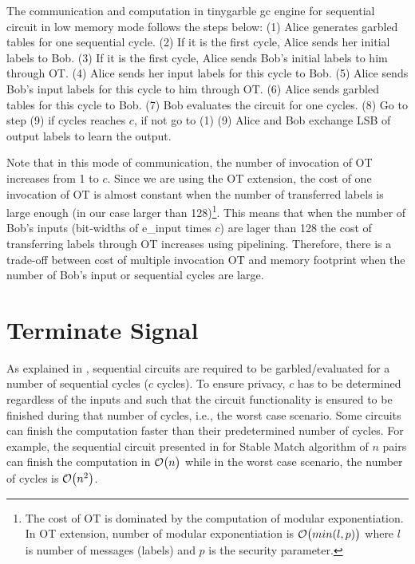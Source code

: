 The communication and computation in \gls{tinygarble} \acrshort{gc} engine for sequential circuit in low memory mode follows the steps below:
(1) Alice generates garbled tables for one sequential cycle.
(2) If it is the first cycle, Alice sends her initial labels to Bob.
(3) If it is the first cycle, Alice sends Bob's initial labels to him through OT.
(4) Alice sends her input labels for this cycle to Bob.
(5) Alice sends Bob's input labels for this cycle to him through OT.
(6) Alice sends garbled tables for this cycle to Bob.
(7) Bob evaluates the circuit for one cycles.
(8) Go to step (9) if cycles reaches $c$, if not go to (1) 
(9) Alice and Bob exchange LSB of output labels to learn the output.

Note that in this mode of communication, the number of invocation of OT increases from 1 to $c$.
Since we are using the OT extension, the cost of one invocation of OT is almost constant when the number of transferred labels is large enough (in our case larger than 128)\footnote{The cost of OT is dominated by the computation of modular exponentiation. In OT extension, number of modular exponentiation is $\mathcal{O}\bigl(min(l, p)\bigr)$ where $l$ is number of messages (labels) and $p$ is the security parameter.}.
This means that when the number of Bob's inputs (bit-widths of e\_input times $c$) are lager than 128 the cost of transferring labels through OT increases using pipelining.
Therefore, there is a trade-off between cost of multiple invocation OT and memory footprint when the number of Bob's input or sequential cycles are large.

\section{Terminate Signal}\label{sec:engine-term}
As explained in , sequential circuits are required to be garbled/evaluated for a number of sequential cycles ($c$ cycles).
To ensure privacy, $c$ has to be determined regardless of the inputs and such that the circuit functionality is ensured to be finished during that number of cycles, i.e., the worst case scenario.
Some circuits can finish the computation faster than their predetermined number of cycles.
For example, the sequential circuit presented in \cite{riazi2017toward} for Stable Match algorithm of $n$ pairs can finish the computation in $\mathcal{O}\bigl(n\bigr)$ while in the worst case scenario, the number of cycles is $\mathcal{O}\bigl(n^2\bigr)$.

